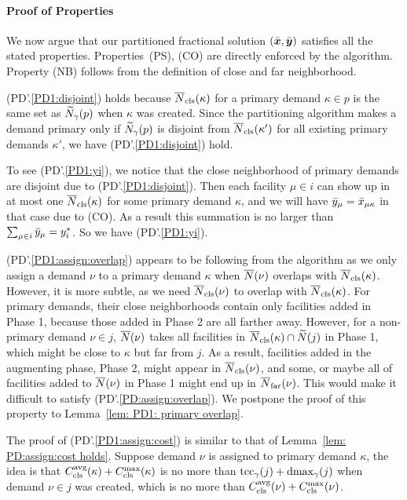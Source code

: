
\medskip
\paragraph{Proof of Properties}
We now argue that our partitioned fractional solution $(\bar{\boldsymbol{x}},\bar{\boldsymbol{y}})$
satisfies all the stated properties. Properties~(PS), (CO) are
directly enforced by the algorithm. Property (NB) follows from the
definition of close and far neighborhood.

(PD'.\ref{PD1:disjoint}) holds because ${\overline{N}}_{\text{cls}}(\kappa)$ for a
primary demand $\kappa \in p$ is the same set as ${\widetilde N}_{\gamma}(p)$ when
$\kappa$ was created. Since the partitioning algorithm makes a demand
primary only if ${\widetilde N}_{\gamma}(p)$ is disjoint from
${\overline{N}}_{\text{cls}}(\kappa')$ for all existing primary demands $\kappa'$, we have
(PD'.\ref{PD1:disjoint}) hold.

To see (PD'.\ref{PD1:yi}), we notice that the close neighborhood of
primary demands are disjoint due to (PD'.\ref{PD1:disjoint}). Then
each facility $\mu \in i$ can show up in at most one
${\overline{N}}_{\text{cls}}(\kappa)$ for some primary demand $\kappa$, and we will have ${\bar y}_{\mu} =
{\bar x}_{\mu\kappa}$ in that case due to (CO). As a result this
summation is no larger than $\sum_{\mu\in i}{\bar y}_{\mu} =
y_i^\ast$. So we have (PD'.\ref{PD1:yi}).

(PD'.\ref{PD1:assign:overlap}) appears to be following from the
algorithm as we only assign a demand $\nu$ to a primary demand
$\kappa$ when ${\overline{N}}(\nu)$ overlaps with
${\overline{N}}_{\text{cls}}(\kappa)$. However, it is more subtle, as we need
${\overline{N}}_{\text{cls}}(\nu)$ to overlap with ${\overline{N}}_{\text{cls}}(\kappa)$. For primary
demands, their close neighborhoods contain only facilities added in
Phase 1, because those added in Phase 2 are all farther away. However,
for a non-primary demand $\nu \in j$, ${\overline{N}}(\nu)$ takes all
facilities in ${\overline{N}}_{\text{cls}}(\kappa)\cap {\widetilde N}(j)$ in Phase 1, which
might be close to $\kappa$ but far from $j$. As a result, facilities
added in the augmenting phase, Phase 2, might appear in
${\overline{N}}_{\text{cls}}(\nu)$, and some, or maybe all of facilities added to
${\overline{N}}(\nu)$ in Phase 1 might end up in ${\overline{N}}_{\text{far}}(\nu)$. This would
make it difficult to satisfy (PD'.\ref{PD:assign:overlap}). We
postpone the proof of this property to Lemma~\ref{lem: PD1: primary
  overlap}.

The proof of (PD'.\ref{PD1:assign:cost}) is similar to that of
Lemma~\ref{lem: PD:assign:cost holds}. Suppose demand $\nu$ is
assigned to primary demand $\kappa$, the idea is that
$C_{\text{cls}}^{{\mbox{\scriptsize\rm avg}}}(\kappa) + C_{\text{cls}}^{\max}(\kappa)$ is no more than $\textrm{tcc}_\gamma(j) +
\text{dmax}_{\gamma}(j)$ when demand $\nu \in j$ was created, which is no
more than $C_{\text{cls}}^{{\mbox{\scriptsize\rm avg}}}(\nu) + C_{\text{cls}}^{\max}(\nu)$.

